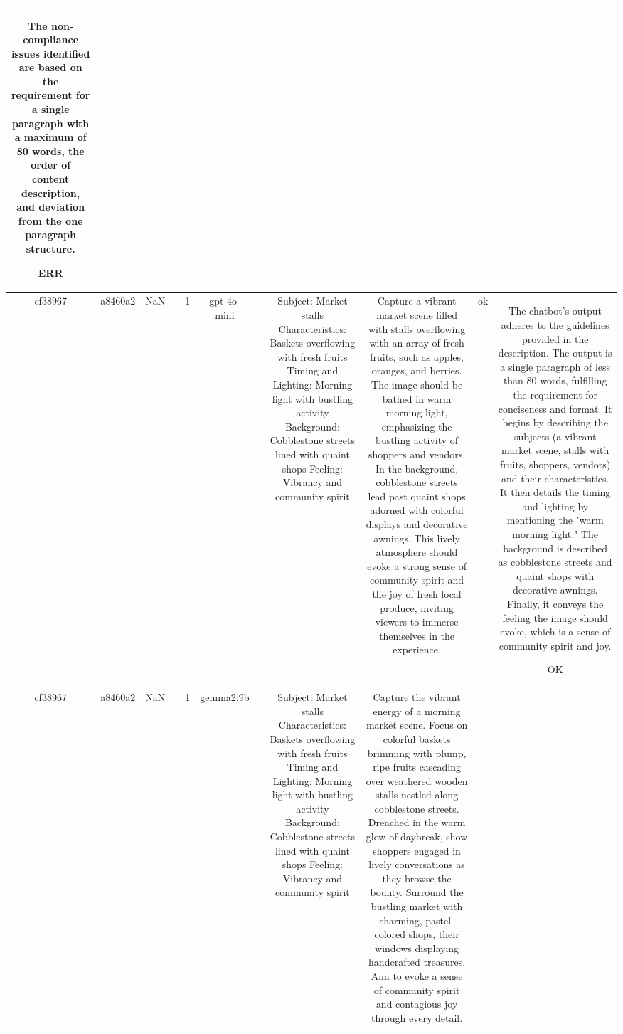 \begin{table}[h!]
\begin{tabular}{|c|c|c|c|c|c|c|c|c|c|c|}
The non-compliance issues identified are based on the requirement for a single paragraph with a maximum of 80 words, the order of content description, and deviation from the one paragraph structure. 

ERR\\
\hline
cf38967 & a8460a2 & NaN &  & 1 & gpt-4o-mini &  & Subject: Market stalls  
Characteristics: Baskets overflowing with fresh fruits  
Timing and Lighting: Morning light with bustling activity  
Background: Cobblestone streets lined with quaint shops  
Feeling: Vibrancy and community spirit & Capture a vibrant market scene filled with stalls overflowing with an array of fresh fruits, such as apples, oranges, and berries. The image should be bathed in warm morning light, emphasizing the bustling activity of shoppers and vendors. In the background, cobblestone streets lead past quaint shops adorned with colorful displays and decorative awnings. This lively atmosphere should evoke a strong sense of community spirit and the joy of fresh local produce, inviting viewers to immerse themselves in the experience. & ok & The chatbot's output adheres to the guidelines provided in the description. The output is a single paragraph of less than 80 words, fulfilling the requirement for conciseness and format. It begins by describing the subjects (a vibrant market scene, stalls with fruits, shoppers, vendors) and their characteristics. It then details the timing and lighting by mentioning the "warm morning light." The background is described as cobblestone streets and quaint shops with decorative awnings. Finally, it conveys the feeling the image should evoke, which is a sense of community spirit and joy. 

OK\\
\hline
cf38967 & a8460a2 & NaN &  & 1 & gemma2:9b &  & Subject: Market stalls  
Characteristics: Baskets overflowing with fresh fruits  
Timing and Lighting: Morning light with bustling activity  
Background: Cobblestone streets lined with quaint shops  
Feeling: Vibrancy and community spirit & Capture the vibrant energy of a morning market scene. Focus on colorful baskets brimming with plump, ripe fruits cascading over weathered wooden stalls nestled along cobblestone streets. Drenched in the warm glow of daybreak, show shoppers engaged in lively conversations as they browse the bounty. Surround the bustling market with charming, pastel-colored shops, their windows displaying handcrafted treasures.  Aim to evoke a sense of community spirit and contagious joy through every detail. 




\end{tabular}
\end{table}

